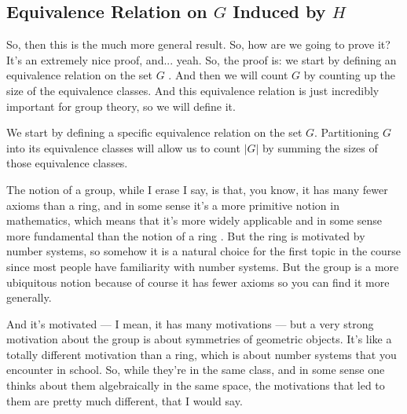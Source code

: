 \begin{proofWrapper}
\subsection{Equivalence Relation on \texorpdfstring{$G$}{G} Induced by \texorpdfstring{$H$}{H}}

\begin{speech}[00:12:34 - 00:13:17]
So, then this is the much more general result. So, how are we going to prove it? It's an extremely nice proof, and... yeah. So, the proof is: we start by defining an equivalence relation on the set $G$ . And then we will count $G$ by counting up the size of the equivalence classes. And this equivalence relation is just incredibly important for group theory, so we will define it.
\end{speech}

\begin{content}
We start by defining a specific equivalence relation on the set $G$. Partitioning $G$ into its equivalence classes will allow us to count $|G|$ by summing the sizes of those equivalence classes.
\end{content}

\begin{speech}[00:13:17 - 00:14:52]
The notion of a group, while I erase I say, is that, you know, it has many fewer axioms than a ring, and in some sense it's a more primitive notion in mathematics, which means that it's more widely applicable and in some sense more fundamental than the notion of a ring . But the ring is motivated by number systems, so somehow it is a natural choice for the first topic in the course since most people have familiarity with number systems. But the group is a more ubiquitous notion because of course it has fewer axioms so you can find it more generally.

And it's motivated --- I mean, it has many motivations --- but a very strong motivation about the group is about symmetries of geometric objects. It's like a totally different motivation than a ring, which is about number systems that you encounter in school. So, while they're in the same class, and in some sense one thinks about them algebraically in the same space, the motivations that led to them are pretty much different, that I would say.


\end{speech}
\end{proofWrapper}
